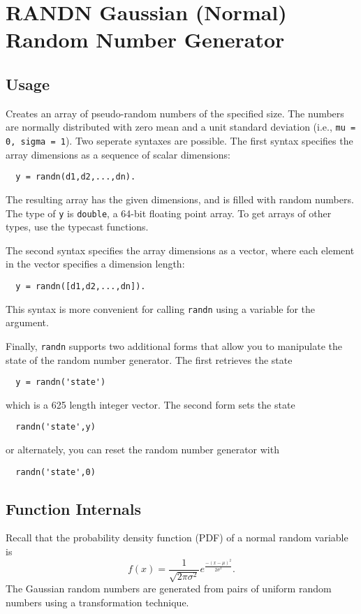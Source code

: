 \section{RANDN Gaussian (Normal) Random Number Generator}

\subsection{Usage}

Creates an array of pseudo-random numbers of the specified size.
The numbers are normally distributed with zero mean and a unit
standard deviation (i.e., \verb|mu = 0, sigma = 1|). 
 Two seperate syntaxes are possible.  The first syntax specifies the array 
dimensions as a sequence of scalar dimensions:
\begin{verbatim}
  y = randn(d1,d2,...,dn).
\end{verbatim}
The resulting array has the given dimensions, and is filled with
random numbers.  The type of \verb|y| is \verb|double|, a 64-bit floating
point array.  To get arrays of other types, use the typecast 
functions.
    
The second syntax specifies the array dimensions as a vector,
where each element in the vector specifies a dimension length:
\begin{verbatim}
  y = randn([d1,d2,...,dn]).
\end{verbatim}
This syntax is more convenient for calling \verb|randn| using a 
variable for the argument.

Finally, \verb|randn| supports two additional forms that allow
you to manipulate the state of the random number generator.
The first retrieves the state
\begin{verbatim}
  y = randn('state')
\end{verbatim}
which is a 625 length integer vector.  The second form sets
the state
\begin{verbatim}
  randn('state',y)
\end{verbatim}
or alternately, you can reset the random number generator with
\begin{verbatim}
  randn('state',0)
\end{verbatim}
\subsection{Function Internals}

Recall that the
probability density function (PDF) of a normal random variable is
\[
f(x) = \frac{1}{\sqrt{2\pi \sigma^2}} e^{\frac{-(x-\mu)^2}{2\sigma^2}}.
\]
The Gaussian random numbers are generated from pairs of uniform random numbers using a transformation technique. 
